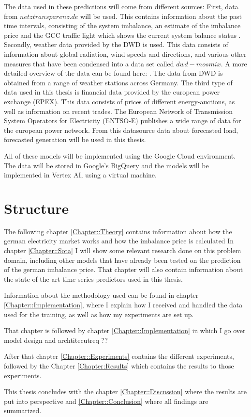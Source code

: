 \documentclass[class=scrbook, crop=false]{standalone}
\begin{document}
The data used in these predictions will come from different sources: First, data from $netztransparenz.de$ will be used. This contains information about the past time intervals, consisting of the system imbalance, an estimate of the imbalance price and the GCC traffic light which shows the current system balance status \cite{NetztransparenzTrafficLight}. Secondly, weather data provided by the DWD is used. This data consists of information about global radiation, wind speeds and directions, and various other measures that have been condensed into a data set called $dwd-mosmix$. A more detailed overview of the data can be found here: \cite{DWDMosmix}. The data from DWD is obtained from a range of weather stations across Germany. The third type of data used in this thesis is financial data provided by the european power exchange (EPEX). This data consists of prices of different energy-auctions, as well as information on recent trades.
The European Network of Transmission System Operators for Electricity (ENTSO-E) publishes a wide range of data for the european power network. From this datasource data about forecasted load, forecasted generation will be used in this thesis. 

All of these models will be implemented using the Google Cloud environment. The data will be stored in Google's BigQuery and the models will be implemented in Vertex AI, using a virtual machine.

\section{Structure}
\label{Section::Structure}
The following chapter \ref{Chapter::Theory} contains information about how the german electricity market works and how the imbalance price is calculated
In chapter \ref{Chapter::Sota} I will show some relevant research done on this problem domain, including other models that have already been tested on the prediction of the german imbalance price. 
That chapter will also contain information about the state of the art time series predictors used in this thesis.

Information about the methodology used can be found in chapter \ref{Chapter::Implementation}, where I explain how I received and handled the data used for the training, as well as how my experiments are set up.

That chapter is followed by chapter \ref{Chapter::Implementation} in which I go over model design and archtitecutreq ??

After that chapter \ref{Chapter::Experiments} contains the different experiments, followed by the Chapter \ref{Chapter:Results} which contains the results to those experiments.

This thesis concludes with the chapter \ref{Chapter::Discussion} where the results are put into perspective and \ref{Chapter::Conclusion} where all findings are summarized.

\ifstandalone
    \printglossary
    \printbibliography[heading=bibintoc]
\fi
\end{document}
